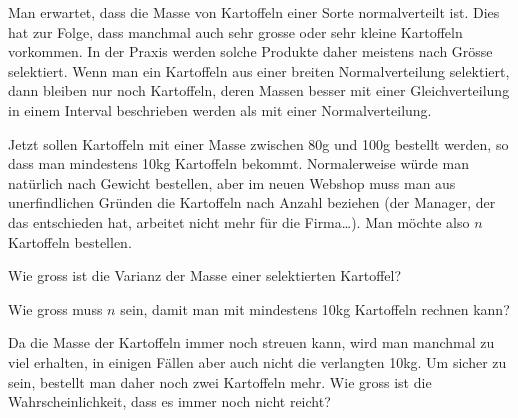Man erwartet, dass die Masse von Kartoffeln einer Sorte normalverteilt ist.
Dies hat zur Folge, dass manchmal auch sehr grosse oder sehr kleine 
Kartoffeln vorkommen.
In der Praxis werden solche Produkte daher meistens nach Grösse
selektiert.
Wenn man ein Kartoffeln aus einer breiten Normalverteilung selektiert,
dann bleiben nur noch Kartoffeln, deren Massen besser mit einer
Gleichverteilung in einem Interval beschrieben werden als mit einer
Normalverteilung.

Jetzt sollen Kartoffeln mit einer Masse zwischen 80g und 100g bestellt
werden, so dass man mindestens 10kg Kartoffeln bekommt.
Normalerweise würde man natürlich nach Gewicht bestellen, aber im neuen
Webshop muss man aus unerfindlichen Gründen die Kartoffeln
nach Anzahl beziehen
(der Manager, der das entschieden hat, arbeitet nicht mehr für die Firma\dots).
Man möchte also $n$ Kartoffeln bestellen.

\begin{teilaufgaben}
\item
Wie gross ist die Varianz der Masse einer selektierten Kartoffel?
\item
Wie gross muss $n$ sein, damit man mit mindestens 10kg Kartoffeln rechnen kann?
\item
Da die Masse der Kartoffeln immer noch streuen kann, wird
man manchmal zu viel erhalten, 
in einigen Fällen aber auch nicht die verlangten 10kg.
Um sicher zu sein, bestellt man daher noch zwei Kartoffeln mehr.
Wie gross ist die Wahrscheinlichkeit, dass es immer noch nicht reicht?
\end{teilaufgaben}


